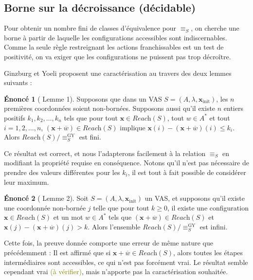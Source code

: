\documentclass[a4paper,final]{article}
\theoremstyle{definition}
\newtheorem*{Statement}{Énoncé}
\let\leq\leqslant
\let\geq\geqslant
\newcommand{\lucas}[1]{\textcolor{olive}{#1}}
\newcommand{\lang}{\ensuremath{\mathcal{L}}}
\newcommand{\reach}{\ensuremath{\textit{Reach}}}
\newcommand{\vect}[1]{\ensuremath{\mathbf{#1}}}
\newcommand{\rel}{\ensuremath{\equiv}}
\newcommand{\relGY}{\ensuremath{\equiv^\text{GY}_S}}
\newcommand{\xinit}{\ensuremath{\vect{x}_\text{init}}}
\newcommand{\valeur}[1]{\ensuremath{\overline{#1}}}
\begin{document}

\subsection{Borne sur la décroissance (décidable)}

Pour obtenir un nombre fini de classes d'équivalence pour $\rel_S$, on cherche une borne à partir de laquelle les configurations accessibles sont indiscernables.
Comme la seule règle restreignant les actions franchissables est un test de positivité, on va exiger que les configurations ne puissent pas trop décroître.

Ginzburg et Yoeli proposent une caractérisation au travers des deux lemmes suivants :


\begin{Statement}[\cite{giyo80} Lemme 1]
    Supposons que dans un VAS $S=(A,\lambda,\xinit)$, les $n$ premières coordonnées soient non-bornées.
    Supposons aussi qu'il existe $n$ entiers positifs $k_1,k_2,\dots,k_n$ tels que pour tout $\vect{x}\in\reach(S)$, tout $w\in A^\ast$ et tout $i=1,2,\dots,n$, 
    $(\vect{x} +\valeur{w})\in\reach(S)$ implique
    $\vect{x}(i) - (\vect{x} +\valeur{w})(i) \leq k_i$.
    Alors $\reach(S)/\relGY$ est fini.
\end{Statement}

Ce résultat est correct, et nous l'adapterons facilement à la relation $\rel_S$ en modifiant la propriété requise en conséquence.
Notons qu'il n'est pas nécessaire de prendre des valeurs différentes pour les $k_i$, il est tout à fait possible de considérer leur maximum.

\begin{Statement}[\cite{giyo80} Lemme 2]
    Soit $S=(A,\lambda,\xinit)$ un VAS, et supposons qu'il existe une coordonnée non-bornée $j$ telle que 
    pour tout $k\geq 0$, il existe une configuration $\vect{x}\in\reach(S)$ et un mot $w\in A^\ast$ tels que 
    $(\vect{x} +\valeur{w}) \in\reach(S)$ et $\vect{x}(j) - (\vect{x} +\valeur{w})(j) > k$.
    Alors l'ensemble $\reach(S)/\relGY$ est infini.
\end{Statement}

Cette fois, la preuve donnée comporte une erreur de même nature que précédemment :
Il est affirmé que si $\vect{x} +\valeur{w} \in\reach(S)$, alors toutes les étapes intermédiaires sont accessibles, ce qui n'est pas forcément vrai.
Le résultat semble cependant vrai \lucas{(à vérifier)}, mais n'apporte pas la caractérisation souhaitée.
\end{document}
